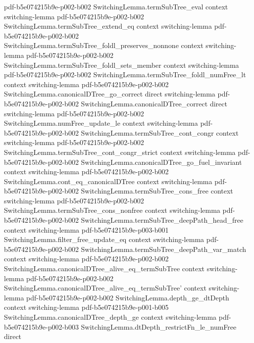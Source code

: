 \begin{lemma}
  {pdf-b5e074215b9e-p002-b002}
\proofstep
  {SwitchingLemma.termSubTree_eval}
  {context}
  {switching-lemma}
  {pdf-b5e074215b9e-p002-b002}
\proofstep
  {SwitchingLemma.termSubTree_extend_eq}
  {context}
  {switching-lemma}
  {pdf-b5e074215b9e-p002-b002}
\proofstep
  {SwitchingLemma.termSubTree_foldl_preserves_nonnone}
  {context}
  {switching-lemma}
  {pdf-b5e074215b9e-p002-b002}
\proofstep
  {SwitchingLemma.termSubTree_foldl_sets_member}
  {context}
  {switching-lemma}
  {pdf-b5e074215b9e-p002-b002}
\proofstep
  {SwitchingLemma.termSubTree_foldl_numFree_lt}
  {context}
  {switching-lemma}
  {pdf-b5e074215b9e-p002-b002}
\proofstep
  {SwitchingLemma.canonicalDTree_go_correct}
  {direct}
  {switching-lemma}
  {pdf-b5e074215b9e-p002-b002}
\proofstep
  {SwitchingLemma.canonicalDTree_correct}
  {direct}
  {switching-lemma}
  {pdf-b5e074215b9e-p002-b002}
\proofstep
  {SwitchingLemma.numFree_update_le}
  {context}
  {switching-lemma}
  {pdf-b5e074215b9e-p002-b002}
\proofstep
  {SwitchingLemma.termSubTree_cont_congr}
  {context}
  {switching-lemma}
  {pdf-b5e074215b9e-p002-b002}
\proofstep
  {SwitchingLemma.termSubTree_cont_congr_strict}
  {context}
  {switching-lemma}
  {pdf-b5e074215b9e-p002-b002}
\proofstep
  {SwitchingLemma.canonicalDTree_go_fuel_invariant}
  {context}
  {switching-lemma}
  {pdf-b5e074215b9e-p002-b002}
\proofstep
  {SwitchingLemma.cont_eq_canonicalDTree}
  {context}
  {switching-lemma}
  {pdf-b5e074215b9e-p002-b002}
\proofstep
  {SwitchingLemma.termSubTree_cons_free}
  {context}
  {switching-lemma}
  {pdf-b5e074215b9e-p002-b002}
\proofstep
  {SwitchingLemma.termSubTree_cons_nonfree}
  {context}
  {switching-lemma}
  {pdf-b5e074215b9e-p002-b002}
\proofstep
  {SwitchingLemma.termSubTree_deepPath_head_free}
  {context}
  {switching-lemma}
  {pdf-b5e074215b9e-p003-b001}
\proofstep
  {SwitchingLemma.filter_free_update_eq}
  {context}
  {switching-lemma}
  {pdf-b5e074215b9e-p002-b002}
\proofstep
  {SwitchingLemma.termSubTree_deepPath_var_match}
  {context}
  {switching-lemma}
  {pdf-b5e074215b9e-p002-b002}
\proofstep
  {SwitchingLemma.canonicalDTree_alive_eq_termSubTree}
  {context}
  {switching-lemma}
  {pdf-b5e074215b9e-p002-b002}
\proofstep
  {SwitchingLemma.canonicalDTree_alive_eq_termSubTree'}
  {context}
  {switching-lemma}
  {pdf-b5e074215b9e-p002-b002}
\proofstep
  {SwitchingLemma.depth_ge_dtDepth}
  {context}
  {switching-lemma}
  {pdf-b5e074215b9e-p001-b005}
\proofstep
  {SwitchingLemma.canonicalDTree_depth_ge}
  {context}
  {switching-lemma}
  {pdf-b5e074215b9e-p002-b003}
\proofstep
  {SwitchingLemma.dtDepth_restrictFn_le_numFree}
  {direct}

\end{lemma}

